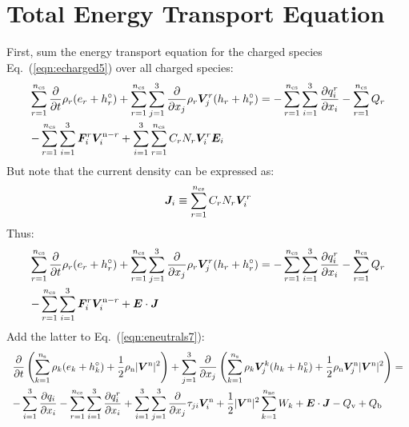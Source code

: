 \documentclass{warpdoc}
\newcommand{\alb}{\vspace{0.1cm}\\} %
\newcommand{\mfd}{\displaystyle}
\newcommand{\ns}{{n_{\rm s}}}
\newcommand{\nns}{{n_{\rm ns}}}
\newcommand{\ncs}{{n_{\rm cs}}}
\renewcommand{\vec}[1]{\bm{#1}}
\begin{document}
\section{Total Energy Transport Equation}

First, sum the energy transport equation for the charged species Eq.\ (\ref{eqn:echarged5}) over all charged species:
%
\begin{equation}
\begin{array}{l}\mfd
\sum_{r=1}^\ncs \frac{\partial }{\partial t}\rho_r (e_r+h_r^\circ) 
+ \sum_{r=1}^\ncs \sum_{j=1}^3  \frac{\partial }{\partial x_j} \rho_r \vec{V}^r_j (h_r+h_r^\circ) 
= 
- \sum_{r=1}^\ncs \sum_{i=1}^{3}\frac{\partial q_i^r}{\partial x_i}
- \sum_{r=1}^\ncs Q_{r} \alb\mfd
-\sum_{r=1}^\ncs \sum_{i=1}^3 \vec{F}_i^r \vec{V}_i^{{\rm n}-r} 
+ \sum_{i=1}^3 \sum_{r=1}^\ncs  C_r N_r  \vec{V}^r_i \vec{E}_i
\end{array}
\end{equation}
%  
But note that the current density can be expressed as:
%
\begin{equation}
 \vec{J}_i \equiv \sum_{r=1}^\ncs  C_r N_r  \vec{V}^r_i
\end{equation}
%
Thus:
%
\begin{equation}
\begin{array}{l}\mfd
\sum_{r=1}^\ncs \frac{\partial }{\partial t}\rho_r (e_r+h_r^\circ) 
+ \sum_{r=1}^\ncs \sum_{j=1}^3  \frac{\partial }{\partial x_j} \rho_r \vec{V}^r_j (h_r+h_r^\circ) 
= 
- \sum_{r=1}^\ncs \sum_{i=1}^{3}\frac{\partial q_i^r}{\partial x_i}
- \sum_{r=1}^\ncs Q_{r}\alb\mfd
-\sum_{r=1}^\ncs \sum_{i=1}^3 \vec{F}_i^r \vec{V}_i^{{\rm n}-r} 
+ \vec{E}\cdot\vec{J}
\end{array}
\end{equation}
%  
Add the latter to Eq.\ (\ref{eqn:eneutrals7}):
%
\begin{equation}
\begin{array}{l}\mfd
 \frac{\partial }{\partial t}\left(\sum_{k=1}^\ns \rho_k (e_k+h_k^\circ)+\frac{1}{2}\rho_{\rm n}|\vec{V}^{\rm n}|^2 \right) 
+ \sum_{j=1}^3  \frac{\partial }{\partial x_j} \left(\sum_{k=1}^\ns \rho_k \vec{V}^k_j (h_k+h_k^\circ)+\frac{1}{2}\rho_{\rm n}\vec{V}^{\rm n}_j|\vec{V}^{\rm n}|^2 \right)
= \alb\mfd
-\sum_{i=1}^{3}\frac{\partial q_i}{\partial x_i}
- \sum_{r=1}^\ncs \sum_{i=1}^{3}\frac{\partial q_i^r}{\partial x_i}
+\sum_{i=1}^3 \sum_{j=1}^3  \frac{\partial }{\partial x_j} \tau_{ji} \vec{V}_i^{\rm n}
+\frac{1}{2}|\vec{V}^{\rm n}|^2 \sum_{k=1}^\nns W_k
+ \vec{E}\cdot\vec{J}
-  Q_{\rm v}
+ Q_{\rm b}
\end{array}
\end{equation}
\end{document}
